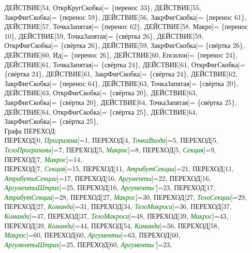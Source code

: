 \documentclass[a0]{a0poster}
\begin{document}
ДЕЙСТВИЕ[54, ОткрКругСкобка]= \{перенос 33\}, ДЕЙСТВИЕ[55, ЗакрФигСкобка]= \{перенос 59\}, ДЕЙСТВИЕ[56, ЗакрФигСкобка]= \{перенос 61\}, ДЕЙСТВИЕ[57, ТочкаЗапятая]= \{перенос 62\}, ДЕЙСТВИЕ[58, Макро]= \{перенос 10\}, ДЕЙСТВИЕ[59, ТочкаЗапятая]= \{свёртка 26\}, ДЕЙСТВИЕ[59, ОткрФигСкобка]= \{свёртка 26\}, ДЕЙСТВИЕ[59, ЗакрФигСкобка]= \{свёртка 26\}, ДЕЙСТВИЕ[60, Ид]= \{перенос 26\}, ДЕЙСТВИЕ[60, Епсилон]= \{перенос 24\}, ДЕЙСТВИЕ[61, ТочкаЗапятая]= \{свёртка 24\}, ДЕЙСТВИЕ[61, ОткрФигСкобка]= \{свёртка 24\}, ДЕЙСТВИЕ[61, ЗакрФигСкобка]= \{свёртка 24\}, ДЕЙСТВИЕ[62, ЗакрФигСкобка]= \{перенос 64\}, ДЕЙСТВИЕ[63, ТочкаЗапятая]= \{свёртка 20\}, ДЕЙСТВИЕ[63, ОткрФигСкобка]= \{свёртка 20\}, ДЕЙСТВИЕ[63, ЗакрФигСкобка]= \{свёртка 20\}, ДЕЙСТВИЕ[64, ТочкаЗапятая]= \{свёртка 25\}, ДЕЙСТВИЕ[64, ОткрФигСкобка]= \{свёртка 25\}, ДЕЙСТВИЕ[64, ЗакрФигСкобка]= \{свёртка 25\},
\\

Графа ПЕРЕХОД:\\
ПЕРЕХОД[0, \textcolor{Green}{\textit{Программа}}]=1, ПЕРЕХОД[4, \textcolor{Green}{\textit{ТочкаВхода}}]=5, ПЕРЕХОД[5, \textcolor{Green}{\textit{ТелоПрограммы}}]=7, ПЕРЕХОД[5, \textcolor{Green}{\textit{Макрос}}]=8, ПЕРЕХОД[5, \textcolor{Green}{\textit{Секция}}]=9, ПЕРЕХОД[7, \textcolor{Green}{\textit{Макрос}}]=14, \\
ПЕРЕХОД[7, \textcolor{Green}{\textit{Секция}}]=15, ПЕРЕХОД[11, \textcolor{Green}{\textit{АтрибутСекции}}]=21, ПЕРЕХОД[11, \textcolor{Green}{\textit{АтрибутыСекции}}]=17, ПЕРЕХОД[16, \textcolor{Green}{\textit{Аргументы}}]=22, ПЕРЕХОД[16, \textcolor{Green}{\textit{АргументыШтрих}}]=25, ПЕРЕХОД[16, \textcolor{Green}{\textit{Аргументы'}}]=23, ПЕРЕХОД[17, \textcolor{Green}{\textit{АтрибутСекции}}]=28, ПЕРЕХОД[27, \textcolor{Green}{\textit{Макрос}}]=30, ПЕРЕХОД[27, \textcolor{Green}{\textit{ТелоСекции}}]=29, ПЕРЕХОД[27, \textcolor{Green}{\textit{Команда}}]=31, ПЕРЕХОД[34, \textcolor{Green}{\textit{ТелоМакроса}}]=36, ПЕРЕХОД[37, \textcolor{Green}{\textit{Команда}}]=47, ПЕРЕХОД[37, \textcolor{Green}{\textit{ТелоМакроса}}]=48, ПЕРЕХОД[39, \textcolor{Green}{\textit{Макрос}}]=43, ПЕРЕХОД[39, \textcolor{Green}{\textit{Команда}}]=44, ПЕРЕХОД[54, \textcolor{Green}{\textit{Команда}}]=56, ПЕРЕХОД[58, \textcolor{Green}{\textit{Макрос}}]=60, ПЕРЕХОД[60, \textcolor{Green}{\textit{Аргументы}}]=63, ПЕРЕХОД[60, \textcolor{Green}{\textit{АргументыШтрих}}]=25, ПЕРЕХОД[60, \textcolor{Green}{\textit{Аргументы'}}]=23,
\\
\end{document}
